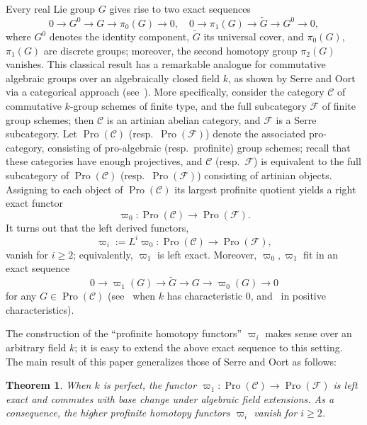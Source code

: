 \documentclass[11pt]{article}
\newtheorem{theo}{Theorem}[section]
\theoremstyle{definition}
\numberwithin{equation}{section}
\newcommand\cC{{\mathcal C}}
\newcommand\cF{{\mathcal F}}
\newcommand\tG{{\widetilde G}}
\DeclareMathOperator{\Pro}{Pro}
\theoremstyle{remark}
\begin{document}
Every real Lie group $G$ gives rise to two exact sequences
\[
0 \to G^0 \to G \to \pi_0(G) \to 0, \quad 0 \to \pi_1(G) \to \tG \to G^0 \to 0,
\]
where $G^0$ denotes the identity component, $\tG$ its universal cover, and $\pi_0(G)$, $\pi_1(G)$ are discrete groups; moreover, the second homotopy group $\pi_2(G)$ vanishes. This classical result has a remarkable analogue for commutative algebraic groups over an algebraically closed field $k$, as shown by Serre and Oort via a categorical approach (see~\cite{Se60,Oort}). More specifically, consider the category $\cC$ of commutative $k$-group schemes of finite type, and the full subcategory $\cF$ of finite group schemes; then $\cC$ is an artinian abelian category, and $\cF$ is a Serre subcategory. Let $\Pro(\cC)$ (resp.~$\Pro(\cF)$) denote the associated pro-category, consisting of pro-algebraic (resp.~profinite) group schemes; recall that these categories have enough projectives, and $\cC$ (resp.~$\cF$) is equivalent to the full subcategory of $\Pro(\cC)$ (resp.~$\Pro(\cF)$) consisting of artinian objects. Assigning to each object of $\Pro(\cC)$ its largest profinite quotient yields a right exact functor
\[
\varpi_0 : \Pro(\cC) \longrightarrow \Pro(\cF).
\]
It turns out that the left derived functors,
\[
\varpi_i := L^i \varpi_0: \Pro(\cC) \longrightarrow \Pro(\cF),
\]
vanish for $i \geq 2$; equivalently, $\varpi_1$ is left exact. Moreover, $\varpi_0, \varpi_1$ fit in an exact sequence
\[
0 \longrightarrow \varpi_1(G) \longrightarrow \tG \longrightarrow G \longrightarrow \varpi_0(G) \longrightarrow 0
\]
for any $G \in \Pro(\cC)$ (see~\cite[6.2, 10.2]{Se60} when $k$ has characteristic $0$, and~\cite[II.7, II.14]{Oort} in positive characteristics).

The construction of the ``profinite homotopy functors'' $\varpi_i$ makes sense over an arbitrary field $k$; it is easy to extend the above exact sequence to this setting. The main result of this paper generalizes those of Serre and Oort as follows:

\begin{theo}\label{thm:funda}
When $k$ is perfect, the functor $\varpi_1 : \Pro(\cC) \to \Pro(\cF)$ is left exact and commutes with base change under algebraic field extensions. As a consequence, the higher profinite homotopy functors $\varpi_i$ vanish for $i \geq 2$.
\end{theo}
\end{document}
